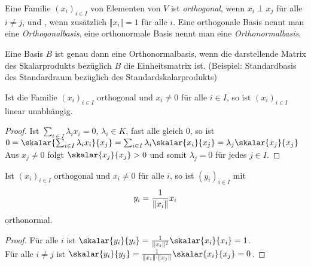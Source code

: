 \begin{definition}[orthonormal]
	Eine Familie $(x_i)_{i\in I}$ von Elementen von $V$ ist \emph{orthogonal}, wenn $x_i\perp x_j$ für alle $i\neq j$, und , wenn zusätzlich $\Vert x_i\Vert=1$ für alle $i$. Eine orthogonale Basis nennt man eine \emph{Orthogonalbasis}, eine orthonormale Basis nennt man eine \emph{Orthonormalbasis}.
\end{definition}

\begin{remark}
	Eine Basis $B$ ist genau dann eine Orthonormalbasis, wenn die darstellende Matrix des Skalarprodukts bezüglich $B$ die Einheitsmatrix ist. (Beispiel: Standardbasis des Standardraum bezüglich des Standardskalarprodukts)
\end{remark}

\begin{lemma}
	Ist die Familie $(x_i)_{i\in I}$ orthogonal und $x_i\neq 0$ für alle $i\in I$, so ist $(x_i)_{i\in I}$ linear unabhängig.
\end{lemma}
\begin{proof}
	Ist $\sum_{i\in I} \lambda_i x_i=0$, $\lambda_i\in K$, fast alle gleich 0, so ist $0=\skalar{\sum_{i\in I} \lambda_i x_i}{x_j}=\sum_{i\in I} \lambda_i\skalar{x_i}{x_j}=\lambda_j\skalar{x_j}{x_j}$ Aus $x_j\neq 0$ folgt $\skalar{x_j}{x_j}>0$ und somit $\lambda_j=0$ für jedes $j\in I$.
\end{proof}

\begin{lemma}
	Ist $(x_i)_{i\in I}$ orthogonal und $x_i\neq 0$ für alle $i$, so ist $(y_i)_{i\in I}$ mit
	\begin{align}
		y_i=\frac{1}{\Vert x_i\Vert}x_i\notag
	\end{align}
	orthonormal.
\end{lemma}
\begin{proof}
	Für alle $i$ ist $\skalar{y_i}{y_i}=\frac{1}{\Vert x_i\Vert^2}\skalar{x_i}{x_i}=1$. \\
	Für alle $i\neq j$ ist $\skalar{y_i}{y_j}=\frac{1}{\Vert x_i\Vert\cdot \Vert x_j\Vert}\skalar{x_i}{x_j}=0$.
\end{proof}

